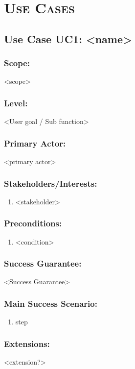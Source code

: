 \documentclass[ProductRequirements.tex]{subfiles}
\begin{document}
\bigskip

\section{\textsc{\Large Use Cases}}
	\subsection{Use Case UC1: <name>}
		\subsubsection*{Scope:}
			<scope>
		\subsubsection*{Level:}
			<User goal / Sub function>
		\subsubsection*{Primary Actor:}
			<primary actor>
		\subsubsection*{Stakeholders/Interests:}
			\begin{enumerate}\itemsep1pt
				\item <stakeholder>
			\end{enumerate}
		\subsubsection*{Preconditions:}
			\begin{enumerate}\itemsep1pt
				\item <condition>
			\end{enumerate}
		\subsubsection*{Success Guarantee:}
			<Success Guarantee>
		\subsubsection*{Main Success Scenario:}
			\begin{enumerate}\itemsep1pt
				\item step
			\end{enumerate}
		\subsubsection*{Extensions:}
			<extension?>
\end{document}
